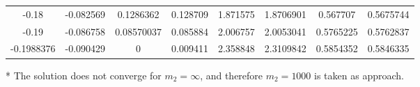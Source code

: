 \begin{threeparttable}
\begin{tabular}{S[table-format=-1.7] S[table-format=4.6] S[table-format=1.8] S[table-format=1.7] S[table-format=1.7] S[table-format=1.7] S[table-format=1.7] S[table-format=1.7]}
         -0.18       &   -0.082569  &  0.1286362   &  0.128709  &  1.871575   &  1.8706901  &  0.567707   &  0.5675744 \\
         -0.19       &   -0.086758  &  0.08570037   &  0.085884  &  2.006757   &  2.0053041  &  0.5765225   &  0.5762837 \\
         -0.1988376       &   -0.090429  &  0   &  0.009411  &  2.358848   &  2.3109842  &  0.5854352   &  0.5846335 \\
        \bottomrule

    \end{tabular}
    \begin{tablenotes}
        \item[*] The solution does not converge for $m_2 = \infty$, and therefore $m_2 = 1000$ is taken as approach.
    \end{tablenotes}
\end{threeparttable}
